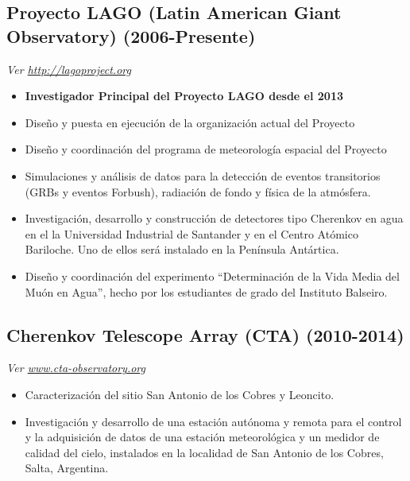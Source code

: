 \subsection*{Proyecto LAGO (Latin American Giant Observatory) (2006-Presente)}
{\small{\textit{Ver \href{http://lagoproject.org}{http://lagoproject.org}}}}
\begin{itemize}
  \item {\bf{Investigador Principal del Proyecto LAGO desde el 2013}}
\item Diseño y puesta en ejecución de la organización actual del Proyecto
\item Diseño y coordinación del programa de meteorología espacial del Proyecto
\item Simulaciones y análisis de datos para la detección de eventos transitorios (GRBs y eventos Forbush), radiación de fondo y física de la atmósfera.
\item Investigación, desarrollo y construcción de detectores tipo Cherenkov en agua en el la Universidad Industrial de Santander y en el Centro Atómico Bariloche. Uno de ellos será instalado en la Península Antártica. 
\item Diseño y coordinación del experimento ``Determinación de la Vida Media del Muón en Agua'', hecho por los estudiantes de grado del Instituto Balseiro.
\end{itemize}

\subsection*{Cherenkov Telescope Array (CTA) (2010-2014)}
{\small{\textit{Ver \href{http://www.cta-observatory.org}{www.cta-observatory.org}}}}
\begin{itemize}
\item Caracterización del sitio San Antonio de los Cobres y Leoncito. %
\item Investigación y desarrollo de una estación autónoma y remota para el control y la adquisición de datos de una estación meteorológica y un medidor de calidad del cielo, instalados en la localidad de San Antonio de los Cobres, Salta, Argentina.
\end{itemize}

